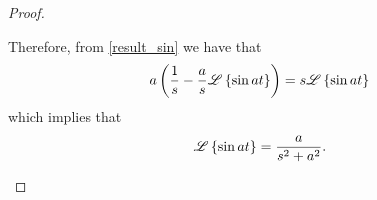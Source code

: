 \begin{proof}
\begin{enumerate}
      Therefore, from \eqref{result_sin} we have that
      \begin{align*}
        a \left(\frac{1}{s} - \frac{a}{s}\mathscr{L}\left\{ {\sin at} \right\}\right) = s \mathscr{L}\left\{ {\sin at} \right\}
      \end{align*}
      which implies that
      \begin{align*}
        \mathscr{L}\left\{ {\sin at} \right\} = \frac{a}{s^2 + a^2}.
      \end{align*}
  \end{enumerate}
\end{proof}
\newpage
